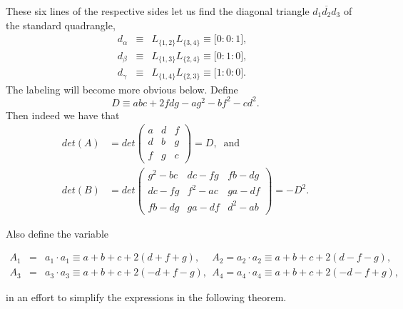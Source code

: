 \documentclass{unswthesis}
\begin{document}
These six lines of the respective sides let us find the diagonal triangle $%
\overline{d_{1}d_{2}d_{3}}$ of the standard quadrangle, 
\begin{eqnarray*}
d_{\alpha } &\equiv &L_{\{1,2\}}L_{\{3,4\}}\equiv \lbrack 0:0:1],\;\; \\
d_{\beta } &\equiv &L_{\{1,3\}}L_{\{2,4\}}\equiv \lbrack 0:1:0],\;\; \\
d_{\gamma } &\equiv &L_{\{1,4\}}L_{\{2,3\}}\equiv \lbrack 1:0:0].
\end{eqnarray*}%
The labeling will become more obvious below. Define 
\begin{equation*}
D\equiv abc+2fdg-ag^{2}-bf^{2}-cd^{2}.
\end{equation*}%
Then indeed we have that 
\begin{align*}
det(A)& =det%
\begin{pmatrix}
a & d & f \\ 
d & b & g \\ 
f & g & c%
\end{pmatrix}%
=D,\;\;\text{and} \\
det(B)& =det%
\begin{pmatrix}
g^{2}-bc & dc-fg & fb-dg \\ 
dc-fg & f^{2}-ac & ga-df \\ 
fb-dg & ga-df & d^{2}-ab%
\end{pmatrix}%
=-D^{2}.
\end{align*}

Also define the variable

\begin{eqnarray*}
A_{1} &=&a_{1}\cdot a_{1}\equiv a+b+c+2\left( d+f+g\right) ,~\quad
A_{2}=a_{2}\cdot a_{2}\equiv a+b+c+2\left( d-f-g\right) ,~~ \\
A_{3} &=&a_{3}\cdot a_{3}\equiv a+b+c+2\left( -d+f-g\right)
,~~A_{4}=a_{4}\cdot a_{4}\equiv a+b+c+2(-d-f+g),
\end{eqnarray*}

in an effort to simplify the expressions in the following theorem.
\end{document}
